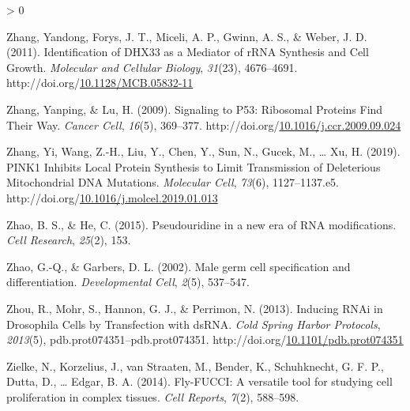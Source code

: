 \documentclass[12pt,oneside]{reedthesis}
\newlength{\cslhangindent}
\newenvironment{CSLReferences}[2] %
 {%
  \setlength{\parindent}{0pt}
  \ifodd #1 \everypar{\setlength{\hangindent}{\cslhangindent}}\ignorespaces\fi
  \ifnum #2 > 0
  \setlength{\parskip}{#2\baselineskip}
  \fi
 }%
 {}
\begin{document}
\begin{CSLReferences}{1}{0}
\leavevmode\hypertarget{ref-zhangIdentificationDHX33Mediator2011}{}%
Zhang, Yandong, Forys, J. T., Miceli, A. P., Gwinn, A. S., \& Weber, J. D. (2011). Identification of {DHX33} as a {Mediator} of {rRNA Synthesis} and {Cell Growth}. \emph{Molecular and Cellular Biology}, \emph{31}(23), 4676--4691. http://doi.org/\href{https://doi.org/10.1128/MCB.05832-11}{10.1128/MCB.05832-11}

\leavevmode\hypertarget{ref-zhangSignalingP53Ribosomal2009}{}%
Zhang, Yanping, \& Lu, H. (2009). Signaling to P53: {Ribosomal Proteins Find Their Way}. \emph{Cancer Cell}, \emph{16}(5), 369--377. http://doi.org/\href{https://doi.org/10.1016/j.ccr.2009.09.024}{10.1016/j.ccr.2009.09.024}

\leavevmode\hypertarget{ref-zhangPINK1InhibitsLocal2019}{}%
Zhang, Yi, Wang, Z.-H., Liu, Y., Chen, Y., Sun, N., Gucek, M., \ldots{} Xu, H. (2019). {PINK1 Inhibits Local Protein Synthesis} to {Limit Transmission} of {Deleterious Mitochondrial DNA Mutations}. \emph{Molecular Cell}, \emph{73}(6), 1127--1137.e5. http://doi.org/\href{https://doi.org/10.1016/j.molcel.2019.01.013}{10.1016/j.molcel.2019.01.013}

\leavevmode\hypertarget{ref-Zhao2015}{}%
Zhao, B. S., \& He, C. (2015). Pseudouridine in a new era of {RNA} modifications. \emph{Cell Research}, \emph{25}(2), 153.

\leavevmode\hypertarget{ref-Zhao2002d}{}%
Zhao, G.-Q., \& Garbers, D. L. (2002). Male germ cell specification and differentiation. \emph{Developmental Cell}, \emph{2}(5), 537--547.

\leavevmode\hypertarget{ref-zhouInducingRNAiDrosophila2013}{}%
Zhou, R., Mohr, S., Hannon, G. J., \& Perrimon, N. (2013). Inducing {RNAi} in {Drosophila Cells} by {Transfection} with {dsRNA}. \emph{Cold Spring Harbor Protocols}, \emph{2013}(5), pdb.prot074351--pdb.prot074351. http://doi.org/\href{https://doi.org/10.1101/pdb.prot074351}{10.1101/pdb.prot074351}

\leavevmode\hypertarget{ref-Zielke2014a}{}%
Zielke, N., Korzelius, J., van Straaten, M., Bender, K., Schuhknecht, G. F. P., Dutta, D., \ldots{} Edgar, B. A. (2014). Fly-{FUCCI}: {A} versatile tool for studying cell proliferation in complex tissues. \emph{Cell Reports}, \emph{7}(2), 588--598.

\end{CSLReferences}

\end{document}
